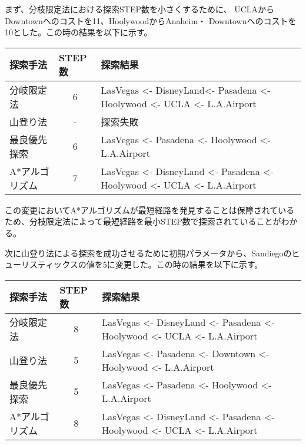 \documentclass{jarticle}
\begin{document}
まず、分枝限定法における探索STEP数を小さくするために、
UCLAからDowntownへのコストを11、HoolywoodからAnaheim・
Downtownへのコストを10とした。この時の結果を以下に示す。


\begin{table}[ht]
  \begin{tabular}{|l|c|l|}
    \hline
    探索手法       & \multicolumn{1}{l|}{STEP数} & 探索結果                                                                                                                 \\ \hline
    分岐限定法     & 6                           & LasVegas \textless{}- DisneyLand\textless{}- Pasadena \textless{}- Hoolywood \textless{}- UCLA \textless{}- L.A.Airport  \\ \hline
    山登り法       & -                           & 探索失敗                                                                                                                 \\ \hline
    最良優先探索   & 6                           & LasVegas \textless{}- Pasadena \textless{}- Hoolywood \textless{}- L.A.Airport                                           \\ \hline
    A*アルゴリズム & 7                           & LasVegas \textless{}- DisneyLand \textless{}- Pasadena \textless{}- Hoolywood \textless{}- UCLA \textless{}- L.A.Airport \\ \hline
  \end{tabular}
\end{table}

この変更においてA*アルゴリズムが最短経路を発見することは保障されているため、分枝限定法によって最短経路を最小STEP数で探索されていることがわかる。

次に山登り法による探索を成功させるために初期パラメータから、Sandiegoのヒューリスティックスの値を5に変更した。この時の結果を以下に示す。

\begin{table}[ht]
  \begin{tabular}{|l|c|l|}
    \hline
    探索手法       & \multicolumn{1}{l|}{STEP数} & 探索結果                                                                                                                 \\ \hline
    分岐限定法     & 8                           & LasVegas \textless{}- DisneyLand \textless{}- Pasadena \textless{}- Hoolywood \textless{}- UCLA \textless{}- L.A.Airport \\ \hline
    山登り法       & 5                           & LasVegas \textless{}- Pasadena \textless{}- Downtown \textless{}- Hoolywood  \textless{}- L.A.Airport                    \\ \hline
    最良優先探索   & 5                           & LasVegas \textless{}- Pasadena \textless{}- Hoolywood \textless{}- L.A.Airport                                           \\ \hline
    A*アルゴリズム & 8                           & LasVegas \textless{}- DisneyLand \textless{}- Pasadena \textless{}- Hoolywood \textless{}- UCLA \textless{}- L.A.Airport \\ \hline
  \end{tabular}
\end{table}
\end{document}
